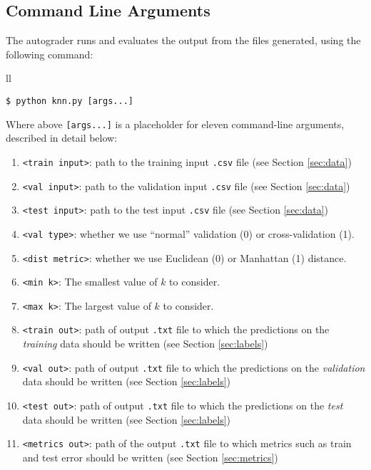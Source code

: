 \documentclass[11pt,addpoints,answers]{exam}
\begin{document}
\subsection{Command Line Arguments}

The autograder runs and evaluates the output from the files  generated, using the following command:

\begin{tabular}{ll}
\begin{lstlisting}[language=Shell]
$ python knn.py [args...]
\end{lstlisting}
\end{tabular}

Where above \lstinline{[args...]} is a placeholder for eleven command-line arguments, described in detail below:
\begin{enumerate}
\item \lstinline{<train input>}: path to the training input \lstinline{.csv} file (see Section \ref{sec:data})
\item \lstinline{<val input>}: path to the validation input \lstinline{.csv} file (see Section \ref{sec:data})
\item \lstinline{<test input>}: path to the test input \lstinline{.csv} file (see Section \ref{sec:data})
\item \lstinline{<val type>}: whether we use ``normal'' validation (0) or cross-validation (1). 
\item \lstinline{<dist metric>}: whether we use Euclidean (0) or Manhattan (1) distance. 
\item \lstinline{<min k>}: The smallest value of $k$ to consider.
\item \lstinline{<max k>}: The largest value of $k$ to consider.
\item \lstinline{<train out>}: path of output \lstinline{.txt} file to which the predictions on the \textit{training} data should be written (see Section \ref{sec:labels})
\item \lstinline{<val out>}: path of output \lstinline{.txt} file to which the predictions on the \textit{validation} data should be written (see Section \ref{sec:labels})
\item \lstinline{<test out>}: path of output \lstinline{.txt} file to which the predictions on the \emph{test} data should be written (see Section \ref{sec:labels})
\item \lstinline{<metrics out>}: path of the output \lstinline{.txt} file to which metrics such as train and test error should be written (see Section \ref{sec:metrics})
\end{enumerate}
\end{document}
